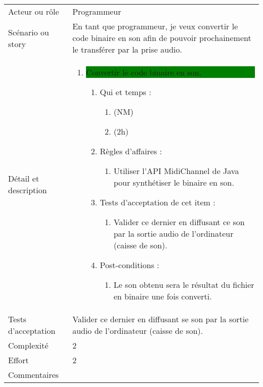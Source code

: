 \begin{longtable}{|l|p{}|}
\hline
    \rowcolor{Gray}
    \multicolumn{2}{|l|}{4} \\
\hline
    Acteur ou rôle & Programmeur \\
\hline
    Scénario ou story & En tant que programmeur, je veux convertir le code binaire en son afin de pouvoir prochainement le transférer par la prise audio. \\
\hline
    Détail et description & 
        \begin{enumerate}[label*=\arabic*.]
        \item \colorbox{Green}{\parbox{13cm}{ Convertir le code binaire en son.}}
            \begin{enumerate}[label*=\arabic*.]
                    \item Qui et temps :
                    \begin{enumerate}[label*=\arabic*.]
                        \item (NM)
                        \item (2h)
                    \end{enumerate}
                    \item Règles d’affaires :
                    \begin{enumerate}[label*=\arabic*.]
                        \item Utiliser l'API MidiChannel de Java pour synthétiser le binaire en son.
                    \end{enumerate}
                    \item Tests d'acceptation de cet item :
                    \begin{enumerate}[label*=\arabic*.]
                        \item Valider ce dernier en diffusant ce son par la sortie audio de l'ordinateur (caisse de son).
                    \end{enumerate}
                    \item Post-conditions :
                    \begin{enumerate}[label*=\arabic*.]
                        \item Le son obtenu sera le résultat du fichier en binaire une fois converti.
                    \end{enumerate}
                \end{enumerate}
        \end{enumerate} \\
\hline
    Tests d'acceptation & Valider ce dernier en diffusant se son par la sortie audio de l'ordinateur (caisse de son). \\
\hline
    Complexité & 2 \\
\hline
    Effort & 2 \\
\hline
    Commentaires &  \\


\end{longtable}
